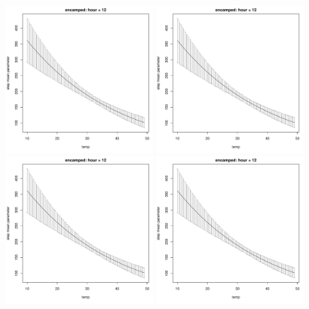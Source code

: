 \documentclass[12pt]{article}
\begin{document}
\begin{figure}[htbp]
  \includegraphics[width=0.49\textwidth,page=17]{plot_elephantResults}
  \includegraphics[width=0.49\textwidth,page=18]{plot_elephantResults}
  \includegraphics[width=0.49\textwidth,page=15]{plot_elephantResults}
  \includegraphics[width=0.49\textwidth,page=16]{plot_elephantResults}

\end{figure}
\end{document}
